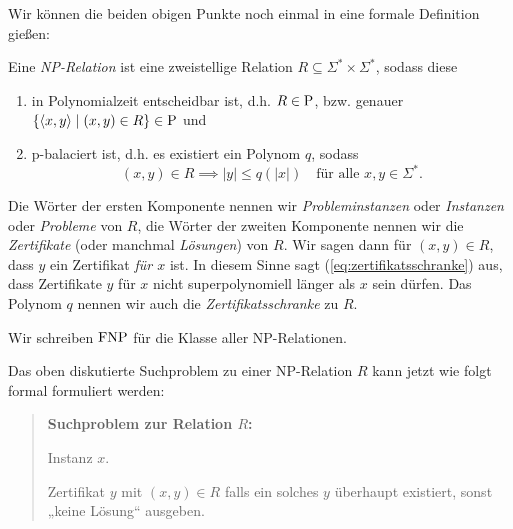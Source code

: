 
Wir können die beiden obigen Punkte noch einmal in eine formale Definition gießen:
\begin{definition}\label{def:np-relation}
    Eine \emph{NP-Relation} ist eine zweistellige Relation $R\subseteq \Sigma^*\times\Sigma^*$, sodass diese
    \begin{enumerate}
        \item in Polynomialzeit entscheidbar ist, d.h. $R\in\P$, bzw. genauer $\{\langle x, y\rangle \mid (x,y)\in R\}\in\P$ und
        \item p-balaciert ist, d.h. es existiert ein Polynom $q$, sodass
            \begin{equation}\label{eq:zertifikatsschranke}
                (x,y)\in R \implies |y|\leq q(|x|) \quad\text{für alle $x,y\in\Sigma^*$}.
            \end{equation}
    \end{enumerate}
    Die Wörter der ersten Komponente nennen wir \emph{Probleminstanzen} oder \emph{Instanzen} oder \emph{Probleme} von $R$, die Wörter der zweiten Komponente nennen wir die \emph{Zertifikate} (oder manchmal \emph{Lösungen}) von $R$. Wir sagen dann für $(x,y)\in R$, dass $y$ ein Zertifikat \emph{für $x$} ist. In diesem Sinne sagt (\ref{eq:zertifikatsschranke})  aus, dass Zertifikate $y$ für $x$ nicht superpolynomiell länger als $x$ sein dürfen.
    Das Polynom $q$ nennen wir auch die \emph{Zertifikatsschranke} zu $R$. 

    Wir schreiben $\FNP$ für die Klasse aller NP-Relationen. \qedhere
\end{definition}
Das oben diskutierte Suchproblem zu einer NP-Relation $R$ kann jetzt wie folgt formal formuliert werden:
\begin{quote}
    \textbf{Suchproblem zur Relation $R$:}
    \begin{description}[nosep]
        \item[Gegeben:] Instanz $x$.
        \item[Gesucht:] Zertifikat $y$ mit $(x,y)\in  R$ falls ein solches $y$ überhaupt existiert, sonst „keine Lösung“ ausgeben.
    \end{description}
\end{quote}
